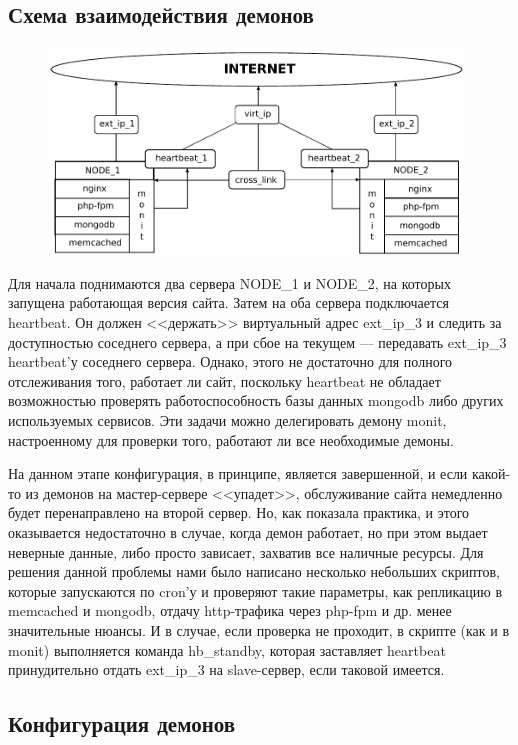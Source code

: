 \documentclass[10pt, a5paper]{article}
\begin{document}
\subsection*{Схема взаимодействия демонов}

\begin{figure}[h!]
  \centering
  \includegraphics[width=11cm]{01_2012_heartbeat}
  \label{fig:Volkovich1}
\end{figure}

Для начала поднимаются два сервера NODE\_1 и NODE\_2, на которых запущена работающая версия сайта. Затем на оба сервера подключается heartbeat. Он должен <<держать>> виртуальный адрес ext\_ip\_3 и следить за доступностью соседнего сервера, а при сбое на текущем --- передавать ext\_ip\_3 heartbeat'у соседнего сервера. Однако, этого не достаточно для полного отслеживания того, работает ли сайт, поскольку heartbeat не обладает возможностью проверять работоспособность базы данных mongodb либо других используемых сервисов. Эти задачи можно делегировать демону monit, настроенному для проверки того, работают ли все необходимые демоны.

На данном этапе конфигурация, в принципе, является завершенной, и если какой-то из демонов на мастер-сервере <<упадет>>, обслуживание сайта немедленно будет перенаправлено на второй сервер. Но, как показала практика, и этого оказывается недостаточно в случае, когда демон работает, но при этом выдает неверные данные, либо просто зависает, захватив все наличные ресурсы. Для решения данной проблемы нами было написано несколько небольших скриптов, которые запускаются по cron'у и проверяют такие параметры, как репликацию в memcached и mongodb, отдачу http-трафика через php-fpm и др. менее значительные нюансы. И в случае, если проверка не проходит, в скрипте (как и в monit) выполняется команда hb\_standby, которая заставляет heartbeat принудительно отдать ext\_ip\_3 на slave-сервер, если таковой имеется.

\subsection*{Конфигурация демонов}
\end{document}
